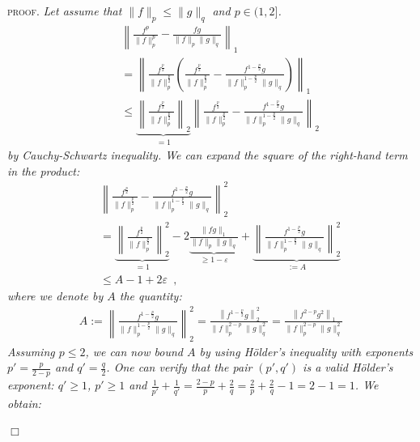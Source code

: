 \documentclass[reqno,oneside,letterpaper,10pt]{article}
\newcommand{\Holder}{H\"older\xspace}
\newcommand{\f}{f}
\newcommand{\g}{g}
\newcommand{\q}{q}
\def\p{p}
\newenvironment{proof}{\textsc{proof.}\it}{\hfill{$\Box$}}
\begin{document}
\begin{proof}
Let assume that  $\|\f\|_{\p} \le \|\g\|_{\q}$ and $p\in(1,2]$. 
\begin{eqnarray}
&&
\left\|
	\frac{\f^{\p}}{\|\f\|^{\p}_{\p}} 
	- 
	\frac{\f\g}{\|\f\|_\p \|\g\|_\q} 
\right\|_1
\nonumber\\
 &&= 
\left\|
	\frac{\f^{\frac{\p}{2}}}{\|\f\|^{\frac{\p}{2}}_{\p}} \left(\frac{\f^{\frac{\p}{2}}}{\|\f\|^{\frac{\p}{2}}_{\p}}
	- 
	\frac{\f^{1-\frac{\p}{2}}\g}{\|\f\|^{1-\frac{\p}{2}}_\p \|\g\|_\q} 
	 \right)
\right\|_1 
\nonumber\\
&&\le
\underbrace{
\left\|
	\frac{\f^{\frac{\p}{2}}}{\|\f\|^{\frac{\p}{2}}_{\p}} 
\right\|_2
}_{=1}
\left\|	
	\frac{\f^{\frac{\p}{2}}}{\|\f\|^{\frac{\p}{2}}_{\p}}
	- 
	\frac{\f^{1-\frac{\p}{2}}\g}{\|\f\|^{1-\frac{\p}{2}}_\p \|\g\|_\q} 
\right\|_2 
\label{eq:temp1}
\nonumber
\end{eqnarray}
by Cauchy-Schwartz inequality. We can expand the square of the right-hand term in the product:
\begin{eqnarray}
&&\left\|	
	\frac{\f^{\frac{\p}{2}}}{\|\f\|^{\frac{\p}{2}}_{\p}}
	- 
	\frac{\f^{1-\frac{\p}{2}}\g}{\|\f\|^{1-\frac{\p}{2}}_\p \|\g\|_\q} 
\right\|_2^2 
\nonumber\\
&&= 
\underbrace{
\left\|	
	\frac{\f^{\frac{\p}{2}}}{\|\f\|^{\frac{\p}{2}}_{\p}}
\right\|_2^2
}_{=1}
- 2 
\underbrace{
\frac{\|fg\|_1}{\|\f\|_\p \|\g\|_\q}
}_{\ge 1-\varepsilon}
+ 
\underbrace{
\left\|	
	\frac{\f^{1-\frac{\p}{2}}\g}{\|\f\|^{1-\frac{\p}{2}}_\p \|\g\|_\q} 
\right\|_2^2
}_{:=A}
\nonumber
\\
&&\le A - 1 + 2\varepsilon
\label{eq:temp2}
\enspace,
\end{eqnarray}
where we denote by $A$ the quantity:
\begin{eqnarray}
A := \left\|	
	\frac{\f^{1-\frac{\p}{2}}\g}{\|\f\|^{1-\frac{\p}{2}}_\p \|\g\|_\q} 
\right\|_2^2
=\frac{\left\|	\f^{1-\frac{\p}{2}}\g \right\|_2^2}{\|\f\|^{2-\p}_\p \|\g\|_\q^2} 
=
	\frac{\left\|	\f^{2-\p}\g^2 \right\|_1}{\|\f\|^{2-\p}_\p \|\g\|_\q^2} 
\nonumber
\end{eqnarray}
Assuming $\p\le 2$, we can now bound $A$ by using \Holder's inequality with exponents $p'=\frac{\p}{2-\p}$ and $\q'=\frac{\q}{2}$. One can verify that the pair $(p',q')$ is a valid \Holder's exponent: $\q'\ge 1$, $\p'\ge1$ and $\frac{1}{\p'}+\frac{1}{\q'}=\frac{2-\p}{\p} + \frac{2}{\q} = \frac{2}{\p} +\frac{2}{\q} - 1 = 2-1=1$. We obtain:

\end{proof}
\end{document}

